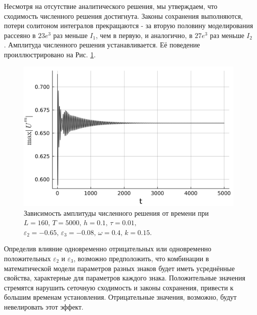 \documentclass[14pt,a4paper]{extreport}
\begin{document}
			Несмотря на отсутствие аналитического решения, мы утверждаем, что сходимость численного решения достигнута. Законы сохранения выполняются, потери солитоном интегралов прекращаются - за вторую половину моделирования рассеяно в \(23e^{3}\) раз меньше \(I_{1}\), чем в первую, и аналогично, в \(27e^{3}\) раз меньше \(I_{2}\). Амплитуда численного решения устанавливается. Её поведение проиллюстрировано на Рис. \ref{fig340-9}.

			\begin{figure}[H]
				\begin{center}
					\includegraphics[width=0.5\linewidth]{fig82.png}
				\end{center}
				\caption{Зависимость амплитуды численного решения от времени при
				\(L=160,\, T=5000,\, h=0.1,\, \tau=0.01,\)
				\(\varepsilon_{2}=-0.65,\,\varepsilon_{3}=-0.08,\, \omega=0.4,\, k=0.15\).}
				\label{fig340-9}
			\end{figure}

			Определив влияние одновременно отрицательных или одновременно положительных \(\varepsilon_{2}\) и \(\varepsilon_{3}\), возможно предположить, что комбинации в математической модели параметров разных знаков будет иметь усреднённые свойства, характерные для параметров каждого знака. Положительные значения стремятся нарушить сеточную сходимость и законы сохранения, привести к большим временам установления. Отрицательные значения, возможно, будут невелировать этот эффект.
\end{document}
